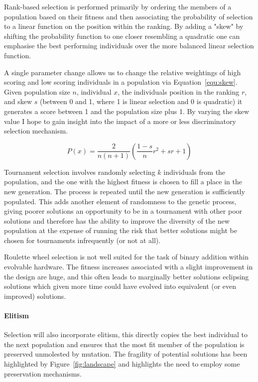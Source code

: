 Rank-based selection is performed primarily by ordering the members of a population
based on their fitness and then associating the probability of selection to a
linear function on the
position within the ranking. By adding a "skew" by shifting the probability function
to one closer resembling a quadratic one can emphasise the best performing
individuals over the more balanced linear selection function.

A single parameter change allows us to change the relative weightings of high scoring
and low scoring individuals in a population via Equation~\ref{equ:skew}. Given
population size $n$, individual $x$, the individuals position in the ranking $r$, and
skew $s$ (between 0 and 1, where 1 is linear selection and 0 is quadratic) it
generates a score between 1 and the population size plus 1. By varying the skew
value I hope to gain insight into the impact of a more or less discriminatory
selection mechanism.

\begin{equation}
	\label{equ:skew}
	P(x) = \frac{2}{n(n+1)} (\frac{1-s}{n}r^2 + sr + 1)
\end{equation}

Tournament selection involves randomly selecting $k$ individuals from the
population, and the one with the highest fitness is chosen to fill a place
in the new generation. The process is repeated until the new generation is
sufficiently populated. This adds another element of randomness to the
genetic process, giving poorer solutions an opportunity to be in a tournament
with other poor solutions and therefore has the ability to improve the
diversity of the new population at the expense of running the risk that
better solutions might be chosen for tournaments infrequently (or not at
all).

Roulette wheel selection is not well suited for the task of binary addition
within evolvable hardware. The fitness increases associated with a slight
improvement in the design are huge, and this often leads to marginally better
solutions eclipsing solutions which given more time could have evolved into
equivalent (or even improved) solutions.

\paragraph{Elitism}

Selection will also incorporate elitism, this directly copies the best individual
to the next population and ensures that the most fit member
of the population is preserved unmolested by mutation. The fragility of potential
solutions has been highlighted by Figure~\ref{fig:landscape} and highlights the
need to employ some preservation mechanisms.

